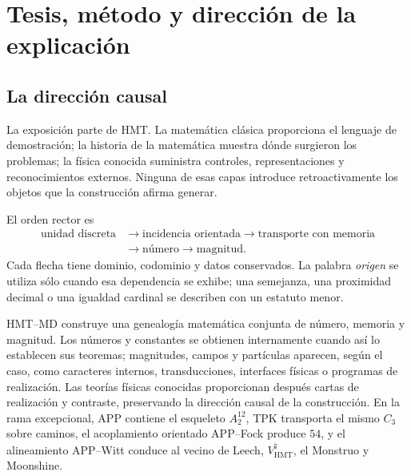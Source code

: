 \chapter*{Tesis, método y dirección de la explicación}

\section*{La dirección causal}

La exposición parte de HMT\@. La matemática clásica proporciona el lenguaje de
demostración; la historia de la matemática muestra dónde surgieron los
problemas; la física conocida suministra controles, representaciones y
reconocimientos externos. Ninguna de esas capas introduce retroactivamente los
objetos que la construcción afirma generar.

El orden rector es
\[
\begin{aligned}
\text{unidad discreta}
&\longrightarrow
\text{incidencia orientada}
\longrightarrow
\text{transporte con memoria}\\
&\longrightarrow
\text{número}
\longrightarrow
\text{magnitud}.
\end{aligned}
\]
Cada flecha tiene dominio, codominio y datos conservados. La palabra
\emph{origen} se utiliza sólo cuando esa dependencia se exhibe; una semejanza,
una proximidad decimal o una igualdad cardinal se describen con un estatuto
menor.

\begin{thesisbox}
HMT--MD construye una genealogía matemática conjunta de número, memoria y
magnitud. Los números y constantes se obtienen internamente cuando así lo
establecen sus teoremas; magnitudes, campos y partículas aparecen, según el
caso, como caracteres internos, transducciones, interfaces físicas o
programas de realización. Las teorías físicas conocidas proporcionan después
cartas de realización y contraste, preservando la dirección causal de la
construcción. En la rama excepcional, APP contiene el esqueleto
\(A_2^{12}\), TPK transporta el mismo \(C_3\) sobre caminos, el acoplamiento
orientado APP--Fock produce \(54\), y el alineamiento APP--Witt conduce al
vecino de Leech, \(V^\natural_{\mathrm{HMT}}\), el Monstruo y Moonshine.
\end{thesisbox}

